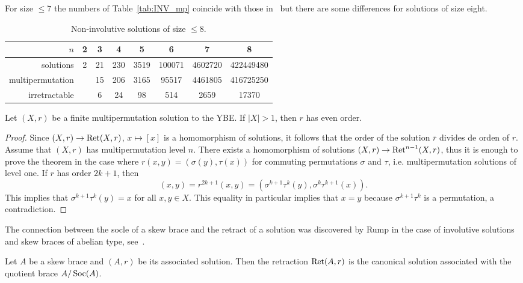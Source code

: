 For size $\leq7$ the numbers of Table~\ref{tab:INV_mp} coincide with those in~\cite{MR1722951}
but there are some differences for solutions of size eight. 

\begin{table}[H]
\centering
\caption{Non-involutive solutions of size $\leq8$.}
\begin{tabular}{|r|ccccccc|}
\hline
$n$ & 2 & 3 & 4 & 5 & 6 & 7 & 8 \tabularnewline
\hline 
solutions & 2 & 21 & 230 & 3519 & 100071 & 4602720  & 422449480 \tabularnewline
multipermutation &  & 15 & 206 & 3165 & 95517 & 4461805 & 416725250 \tabularnewline
irretractable & & 6 & 24 & 98 & 514 & 2659 & 17370\tabularnewline
\hline
\end{tabular}
\label{tab:mp}
\end{table}



\begin{theorem}
\label{thm:CJKAV}
    Let $(X,r)$ be a finite multipermutation solution to the YBE. If $|X|>1$, then $r$ has even order. 
\end{theorem}

\begin{proof}
    Since $(X,r)\to\operatorname{Ret}(X,r)$, $x\mapsto[x]$ is a homomorphism of solutions, 
    it follows that the order of the solution $\overline{r}$ divides de orden of $r$. 
    Assume that $(X,r)$ has multipermutation level $n$. 
    There exists a homomorphism of solutions $(X,r)\to\operatorname{Ret}^{n-1}(X,r)$, thus 
    it is enough to prove the theorem in the case where
    $r(x,y)=(\sigma(y),\tau(x))$ for commuting permutations $\sigma$ and $\tau$, i.e. 
    multipermutation solutions of level one. If $r$ has order $2k+1$, then 
    \[
    (x,y)=r^{2k+1}(x,y)=(\sigma^{k+1}\tau^k(y),\sigma^k\tau^{k+1}(x)).
    \]
    This implies that $\sigma^{k+1}\tau^k(y)=x$ for all $x,y\in X$. This equality in particular 
    implies that $x=y$ because $\sigma^{k+1}\tau^k$ is a permutation, a contradiction. 
\end{proof}

The connection between the socle of a skew brace and the 
retract of a solution was discovered by Rump in the case of 
involutive solutions and skew braces of abelian type, see~\cite{MR2278047}. 

\begin{proposition}
\label{pro:add_cyclic}
Let $A$ be a skew brace and $(A,r)$ be its associated solution. 
Then the retraction $\operatorname{Ret}(A,r)$ is the canonical solution associated with the quotient brace $A/\operatorname{Soc}(A)$. 
\end{proposition}

